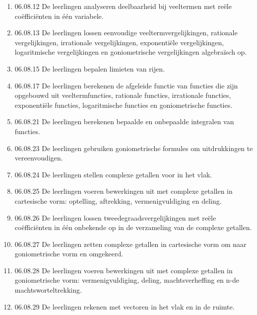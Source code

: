 \documentclass{article}
\begin{document}
\begin{enumerate}
    \item 06.08.12 De leerlingen analyseren deelbaarheid bij veeltermen met reële coëfficiënten in één variabele.
    
    \item 06.08.13 De leerlingen lossen eenvoudige veeltermvergelijkingen, rationale vergelijkingen, irrationale vergelijkingen, exponentiële vergelijkingen, logaritmische vergelijkingen en goniometrische vergelijkingen algebraïsch op.
    
    \item 06.08.15 De leerlingen bepalen limieten van rijen.
    
    \item {06.08.17 De leerlingen berekenen de afgeleide functie van functies die zijn opgebouwd uit veeltermfuncties, rationale functies, irrationale functies, exponentiële functies, logaritmische functies en goniometrische functies.}
    
    \item 06.08.21 De leerlingen berekenen bepaalde en onbepaalde integralen van functies.
    
    \item 06.08.23 De leerlingen gebruiken goniometrische formules om uitdrukkingen te vereenvoudigen.
    
    \item { 06.08.24 De leerlingen stellen complexe getallen voor in het vlak.}
    
    \item { 06.08.25 De leerlingen voeren bewerkingen uit met complexe getallen in cartesische vorm: optelling, aftrekking, vermenigvuldiging en deling.}
    
    \item { 06.08.26 De leerlingen lossen tweedegraadsvergelijkingen met reële coëfficiënten in één onbekende op in de verzameling van de complexe getallen.}
    
    \item { 06.08.27 De leerlingen zetten complexe getallen in cartesische vorm om naar goniometrische vorm en omgekeerd.}
    
    \item 06.08.28 De leerlingen voeren bewerkingen uit met complexe getallen in goniometrische vorm: vermenigvuldiging, deling, machtsverheffing en n-de machtsworteltrekking.
    
    \item 06.08.29 De leerlingen rekenen met vectoren in het vlak en in de ruimte.
    

\end{enumerate}
\end{document}
